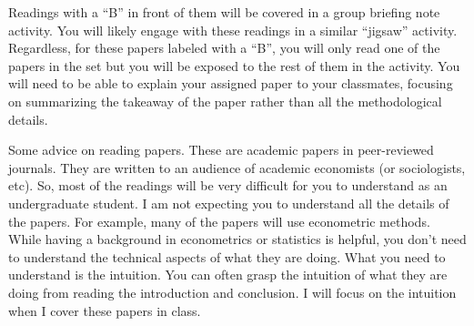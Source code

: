 \documentclass[11pt,letterpaper,final]{article}
\begin{document}
Readings with a ``B'' in front of them will be covered in a group briefing note activity. You will likely engage with these readings in a similar ``jigsaw'' activity. Regardless, for these papers labeled with a ``B'', you will only read one of the papers in the set but you will be exposed to the rest of them in the activity. You will need to be able to explain your assigned paper to your classmates, focusing on summarizing the takeaway of the paper rather than all the methodological details.

Some advice on reading papers. These are academic papers in peer-reviewed journals. They are written to an audience of academic economists (or sociologists, etc). So, most of the readings will be very difficult for you to understand as an undergraduate student. I am not expecting you to understand all the details of the papers. For example, many of the papers will use econometric methods. While having a background in econometrics or statistics is helpful, you don't need to understand the technical aspects of what they are doing. What you need to understand is the intuition. You can often grasp the intuition of what they are doing from reading the introduction and conclusion. I will focus on the intuition when I cover these papers in class.
\end{document}

